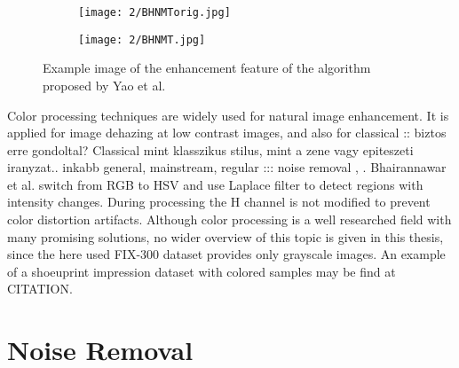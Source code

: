 \documentclass[draft,final]{vutinfth} %
\begin{document}
\begin{figure}[h]
  \centering
  \begin{subfigure}[b]{0.4\columnwidth}
    \centering
    \texttt{[image: 2/BHNMTorig.jpg]}
    \label{fig:rw:BHNMTin}
  \end{subfigure}
  \begin{subfigure}[b]{0.4\columnwidth}
    \centering
    \texttt{[image: 2/BHNMT.jpg]}
    \label{fig:rw:BHNMTout}
  \end{subfigure}
  \caption{Example image  \cite{yao2016image} of the enhancement feature of the algorithm proposed by Yao et al. \cite{yao2016image} }
  \label{fig:rw:BHNMT} %
\end{figure}

\par
Color processing techniques are widely used for natural image enhancement.
It is applied for image dehazing at low contrast images, \cite{singh2018dehazing} and also for classical :: biztos erre gondoltal? Classical mint klasszikus stilus, mint a zene vagy epiteszeti iranyzat.. inkabb general, mainstream, regular ::: noise removal \cite{ren2018joint}, \cite{zhang2016simultaneous}. 
Bhairannawar et al. \cite{bhairannawar2017color} switch from RGB to HSV and use Laplace filter to detect regions with intensity changes. 
During processing the H channel is not modified to prevent color distortion artifacts.
Although color processing is a well researched field with many promising solutions, no wider overview of this topic is given in this thesis, since the here used FIX-300 dataset provides only grayscale images. An example of a shoeuprint impression dataset with colored samples may be find at CITATION. 


\section{Noise Removal}
\end{document}
